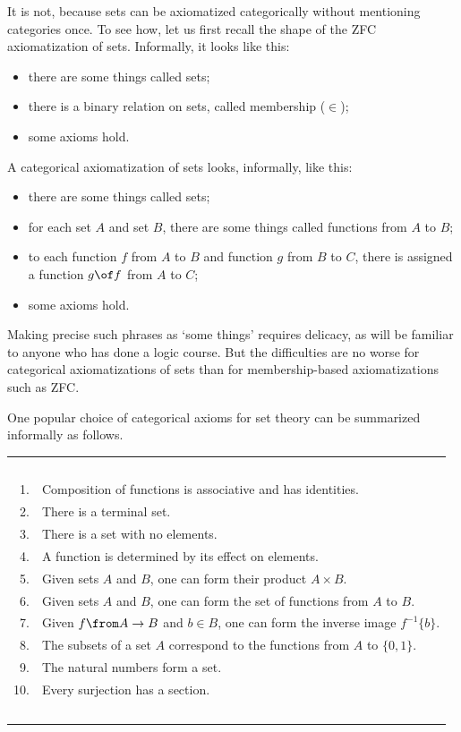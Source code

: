 It is not, because sets can be axiomatized categorically without mentioning
categories once.  To see how, let us first recall the shape of the ZFC
axiomatization of sets.  Informally, it looks like this:
% 
\begin{itemize}
\item 
there are some things called sets;

\item 
there is a binary relation on sets, called membership ($\in$);

\item 
some axioms hold.
\end{itemize}
% 
A categorical axiomatization of sets looks, informally, like this:
% 
\begin{itemize}
\item 
there are some things called sets;

\item 
for each set $A$ and set $B$, there are some things called functions from
$A$ to $B$;

\item 
to each function $f$ from $A$ to $B$ and function $g$ from $B$ to $C$,
there is assigned a function $g\of f$ from $A$ to $C$;

\item 
some axioms hold.
\end{itemize}
% 
Making precise such phrases as `some things' requires delicacy, as will be
familiar to anyone who has done a logic course.  But the difficulties are
no worse for categorical axiomatizations of sets than for membership-based
axiomatizations such as ZFC.

One popular choice of categorical axioms for set theory can be summarized
informally as follows.

\begin{tabular}{@{}r@{\ \ }l}
\ \\
1. &Composition of functions is associative and has identities.\\
2. &There is a terminal set.\\
3. &There is a set with no elements.\\
4. &A function is determined by its effect on elements.\\
5. &Given sets $A$ and $B$, one can form their product $A \times B$.\\
6. &Given sets $A$ and $B$, one can form the set of functions from $A$ to
$B$.\\ 
7. &Given $f\from A \to B$ and $b \in B$, one can form the inverse image
$f^{-1}\{b\}$.\\ 
8. &The subsets of a set $A$ correspond to the functions from $A$ to $\{0,
1\}$.\\ 
9. &The natural numbers form a set.\\
10. &Every surjection has a section.\\
\ \\
\end{tabular}

